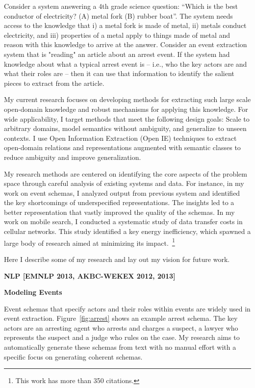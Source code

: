 \documentclass[a4paper,11pt,onecolumn]{article}
\begin{document}
Consider a system answering a 4th grade science question:  ``Which is the best conductor of electricity? (A) metal fork (B) rubber boat''. The system needs access to the knowledge that i) a metal fork is made of metal, ii) metals conduct electricity, and iii) properties of a metal apply to things made of metal and reason with this knowledge to arrive at the answer. Consider an event extraction system that is "reading" an article about an arrest event. If the system had knowledge about what a typical arrest event is -- i.e., who the key actors are and what their roles are -- then it can use that information to identify the salient pieces to extract from the article. 

My current research focuses on developing methods for extracting such large scale open-domain knowledge and robust mechanisms for applying this knowledge. For wide applicability, I target methods that meet the following design goals: Scale to arbitrary domains, model semantics without ambiguity, and generalize to unseen contexts. I use Open Information Extraction (Open IE) techniques to extract open-domain relations and representations augmented with semantic classes to reduce ambiguity and improve generalization.

My research methods are centered on identifying the core aspects of the problem space through careful analysis of existing systems and data. For instance, in my work on event schemas, I analyzed output from previous system and identified the key shortcomings of underspecified representations. The insights led to a better representation that vastly improved the quality of the schemas. In my work on mobile search, I conducted a systematic study of data transfer costs in cellular networks. This study identified a key energy inefficiency, which spawned a large body of research aimed at minimizing its impact.~\footnote{This work has more than 350 citations.} 

Here I describe some of my research and lay out my vision for future work.

{\bf NLP [EMNLP 2013, AKBC-WEKEX 2012, 2013]}

{\bf Modeling Events}

Event schemas that specify actors and their roles within events are widely used in event extraction. Figure~\ref{fig:arrest} shows an example arrest schema. The key actors are an arresting agent who arrests and charges a suspect, a lawyer who represents the suspect and a judge who rules on the case. %
My research aims to automatically generate these schemas from text with no manual effort with a specific focus on generating coherent schemas.
\end{document}
